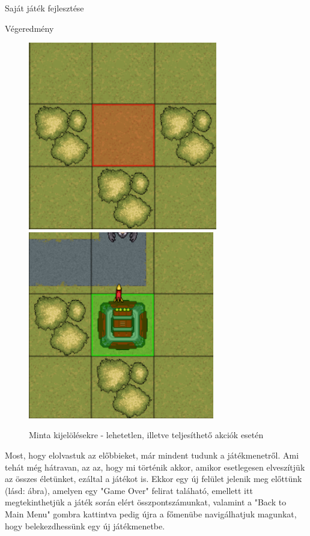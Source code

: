 \begin{MyChapter}{Saját játék fejlesztése}
\begin{MySection}{Végeredmény}
		\begin{figure}[h!]
			\centering
			\includegraphics[scale=0.848]{kepek/jatekHasznalat/minta_rossz_kijeloles}
			\includegraphics[scale=0.85]{kepek/jatekHasznalat/minta_jo_kijeloles}
			\caption{Minta kijelölésekre - lehetetlen, illetve teljesíthető akciók esetén}
			\label{fig:jatekHasznalat:kijeloles_minta}
		\end{figure}
		
		
		Most, hogy elolvastuk az előbbieket, már mindent tudunk a játékmenetről. Ami tehát még hátravan, az az, hogy mi történik akkor, amikor esetlegesen elveszítjük az összes életünket, ezáltal a játékot is.
		Ekkor egy új felület jelenik meg előttünk (lásd:  ábra), amelyen egy "Game Over" felirat taláható, emellett itt megtekinthetjük a játék során elért összpontszámunkat, valamint a "Back to Main Menu" gombra kattintva pedig újra a főmenübe navigálhatjuk magunkat, hogy belekezdhessünk egy új játékmenetbe.
		

\end{MySection}
\end{MyChapter}
